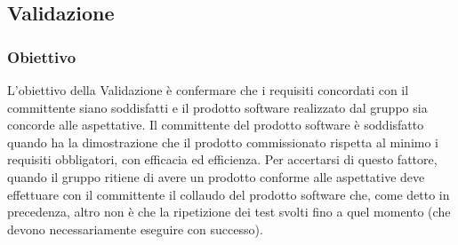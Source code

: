 \subsection{Validazione}
\subsubsection{Obiettivo}
L’obiettivo della Validazione è confermare che i requisiti concordati con il committente siano soddisfatti e il prodotto software realizzato dal gruppo sia concorde alle aspettative.
Il committente del prodotto software è soddisfatto quando ha la dimostrazione che il prodotto commissionato rispetta al minimo i requisiti obbligatori, con efficacia ed efficienza.
Per accertarsi di questo fattore, quando il gruppo ritiene di avere un prodotto conforme alle aspettative deve effettuare con il committente il collaudo del prodotto software che, come detto in precedenza, altro non è che la ripetizione dei test svolti fino a quel momento (che devono necessariamente eseguire con successo).
